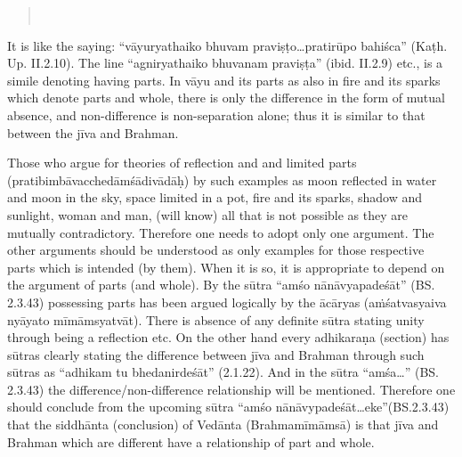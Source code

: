 \begin{verse}
\\
\end{verse}


It is like the saying: “vāyuryathaiko bhuvam praviṣṭo…pratirūpo bahiśca” (Kaṭh. Up. II.2.10). The line “agniryathaiko bhuvanam praviṣṭa” (ibid. II.2.9) etc., is a simile denoting having parts.  In vāyu and its parts as also in fire and its sparks which denote parts and whole, there is only the difference in the form of mutual absence, and non-difference is non-separation alone; thus it is similar to that between the jīva and Brahman.

Those who argue for theories of reflection and and limited parts (pratibimbāvacchedāmśādivādāḥ) by such examples as moon reflected in water and moon in the sky, space limited in a pot, fire and its sparks, shadow and sunlight, woman and man, (will know) all that is not possible as they are mutually contradictory. Therefore one needs to adopt only one argument. The other arguments should be understood as only examples for those respective parts which is intended (by them). When it is so, it is appropriate to depend on the argument of parts (and whole).  By the sūtra “amśo nānāvyapadeśāt” (BS. 2.3.43) possessing parts has been argued logically by the ācāryas (aṁśatvasyaiva nyāyato mīmāmsyatvāt). There is absence of any definite sūtra stating unity through being a reflection etc. On the other hand every adhikaraṇa (section) has sūtras clearly stating the difference between jīva and Brahman through such sūtras as “adhikam tu bhedanirdeśāt” (2.1.22). And in the sūtra “amśa…” (BS. 2.3.43) the difference/non-difference relationship will be  mentioned. Therefore one should conclude from the upcoming sūtra “amśo nānāvypadeśāt…eke”(BS.2.3.43) that the siddhānta (conclusion) of Vedānta (Brahmamīmāmsā) is that jīva and Brahman which are different have a relationship of part and whole.

